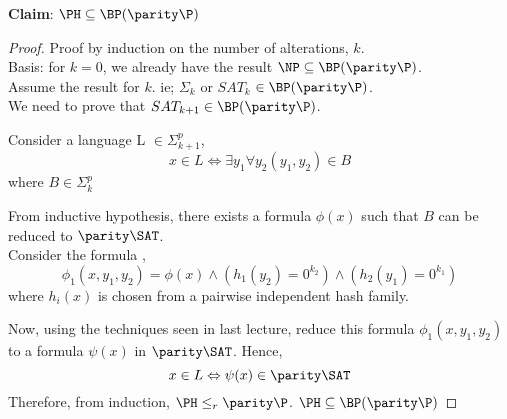\textbf{Claim}: $\PH\subseteq\BP(\parity\P)$
\begin{proof} Proof by induction on the number of alterations, $k$.\\
  Basis: for $k=0$, we already have the result
  $\NP\subseteq\BP(\parity\P)$.\\ Assume the result for $k$. ie;
  $\Sigma_k$ or $SAT_k$ $\in \BP(\parity\P)$.\\ We need to prove that
  $SAT_{k+1}\in \BP(\parity\P)$.

  Consider a language L $\in \Sigma_{k+1}^{p}$, 
  $$ x \in L \Leftrightarrow \exists y_{1} \forall y_{2} (y_{1},y_{2}) \in B$$ where $B \in \Sigma_{k}^{p}$
  
  From inductive hypothesis, there exists a formula $\phi(x)$ such that $B$ can be reduced to $\parity \SAT$. \\
  Consider the formula ,
  $$\phi_{1}(x,y_{1},y_{2}) = \phi(x) \wedge (h_{1}(y_{2}) = 0^{k_{2}}) \wedge (h_{2}(y_{1}) = 0^{k_{1}})$$
  where $h_{i}(x)$ is chosen from a pairwise independent hash family. \newline
  
  Now, using the techniques seen in last lecture, reduce this formula $\phi_{1}(x,y_{1},y_{2})$ to a formula $\psi(x)$ in $\parity \SAT$. \newline
  Hence, 
    $$ x \in L \Leftrightarrow \psi(x) \in \parity \SAT$$
    Therefore, from induction, $\PH \leq_{r} \parity \P$.\newline
    $\PH \subseteq \BP(\parity \P)$
  
 \begin{comment} 
 $$\phi\in SAT_k\Rightarrow Pr[\parity_z\phi\land\tau(x,z)]\geq(1-\frac{1}{2^{q(n)}})$$
$$\phi\notin SAT_k\Rightarrow Pr[\parity_z\phi\land\tau(x,z)]\leq \frac{1}{2^{q(n)}}   $$
Now, any $\phi '\in SAT_{k+1}$ can be written as $\phi
'=\exists\sigma$ where $\sigma\in SAT_k$
$$\phi '\in SAT_{k+1}\Rightarrow\exists\sigma\in SAT_k\mbox{ with } \sigma\in\Pi_k$$

Let $\sigma '=\exists(\lnot\varphi)$ where $\sigma=\lnot\varphi$\\
$$\lnot(\forall\varphi)\Rightarrow\exists\sigma\Rightarrow Pr[\sigma '\in\parity SAT]\geq (1-\frac{1}{2^{q(n)}})$$
$$\forall\varphi\Rightarrow\lnot\exists\sigma\Rightarrow Pr[\sigma '\notin\parity SAT]\geq (1-\frac{1}{2^{q(n)}})$$
From inductive hypothesis,
$$\forall\varphi\Rightarrow Pr[\sigma ''\in\parity SAT]\geq (1-\frac{1}{2^{q(n)}})$$
$$\lnot\forall\varphi\Rightarrow Pr[\sigma ''\notin\parity SAT]\geq (1-\frac{1}{2^{q(n)}})$$
$$\varphi\rightarrow\varphi\land(h(y)=0^k)\rightarrow\varphi\land(h(y)=0^{k_1}\land h(x)=0^{k_2})$$
$$\phi=\exists\forall\varphi$$
\end{comment}

\end{proof}

